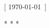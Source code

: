 
\clearpage
\thispagestyle{empty}
\vspace*{\fill}
\noindent
\begin{center}
	\sffamily\small
	[ \today\ ]
	\vspace{0.5cm}
	\par
	\noindent
	* * *
\end{center}
\vspace*{\fill}